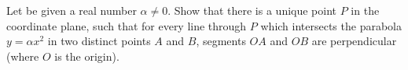 Let be given a real number $\alpha\ne0$. Show that there is a unique point $P$ in the coordinate plane, such that for every line through $P$ which intersects the parabola $y=\alpha x^2$ in two distinct points $A$ and $B$, segments $OA$ and $OB$ are perpendicular (where $O$ is the origin).